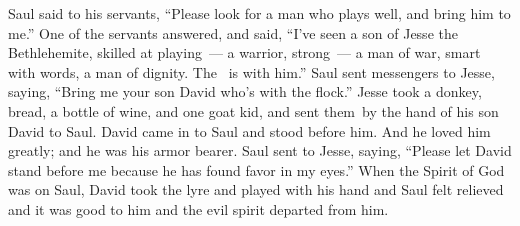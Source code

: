 \begin{inparaenum}
   Saul said to his servants, ``Please look for a man who plays well, and bring him to me.''%
   One of the servants answered, and said, ``I've seen a son of Jesse the Bethlehemite, skilled at playing~--- a warrior, strong~--- a man of war, smart with words, a man of dignity. The \lord\ is with him.''%
   Saul sent messengers to Jesse, saying, ``Bring me your son David who's with the flock.''%
   Jesse took a donkey, bread, a bottle of wine, and one goat kid, and sent them\understood{}\ by the hand of his son David to Saul.%
   David came in to Saul and stood before him. And he loved him greatly; and he was his armor bearer.%
   Saul sent to Jesse, saying, ``Please let David stand before me because he has found favor in my eyes.''%
   When the Spirit of God was on Saul, David took the lyre and played with his hand and Saul felt relieved and it was good to him and the evil spirit departed from him.%
\end{inparaenum}
